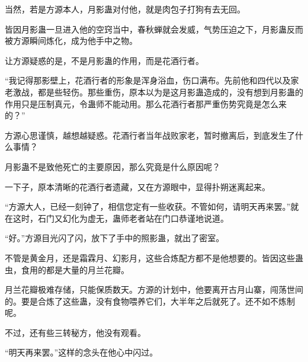 \begin{this_body}
当然，若是方源本人，月影蛊对付他，就是肉包子打狗有去无回。

皆因月影蛊一旦进入他的空窍当中，春秋蝉就会发威，气势压迫之下，月影蛊反而被方源瞬间炼化，成为他手中之物。

让方源疑惑的是，不是月影蛊的作用，而是花酒行者。

“我记得那影壁上，花酒行者的形象是浑身浴血，伤口满布。先前他和四代以及家老激战，都是些轻伤。那些重伤，原本以为是这月影蛊造成的，没有想到月影蛊的作用只是压制真元，令蛊师不能动用。那么花酒行者那严重伤势究竟是怎么来的？”

方源心思谨慎，越想越疑惑。花酒行者当年战败家老，暂时撤离后，到底发生了什么事情？

月影蛊不是致他死亡的主要原因，那么究竟是什么原因呢？

一下子，原本清晰的花酒行者遗藏，又在方源眼中，显得扑朔迷离起来。

“方源大人，已经一刻钟了，相信您定有一些收获。不管如何，请明天再来罢。”就在这时，石门又幻化为虚无，蛊师老者站在门口恭谨地说道。

“好。”方源目光闪了闪，放下了手中的照影蛊，就出了密室。

不管是黄金月，还是霜霖月、幻影月，这些合炼配方都不是他想要的。皆因这些蛊虫，食用的都是大量的月兰花瓣。

月兰花瓣极难存储，只能保质数天。方源的计划中，他要离开古月山寨，闯荡世间的。要是合炼了这些蛊，没有食物喂养它们，大半年之后就死了。还不如不炼制呢。

不过，还有些三转秘方，他没有观看。

“明天再来罢。”这样的念头在他心中闪过。

\end{this_body}

